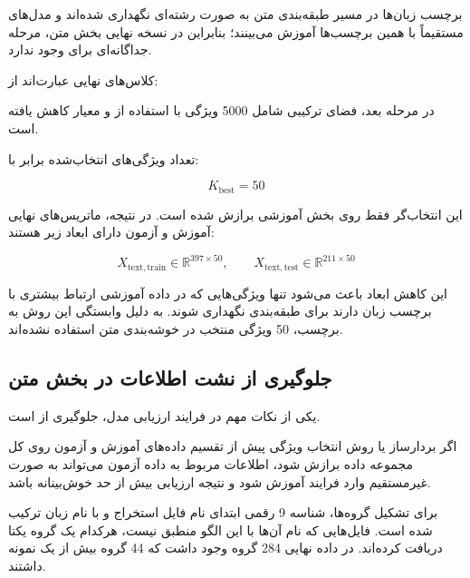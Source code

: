 برچسب زبان‌ها در مسیر طبقه‌بندی متن به صورت رشته‌ای نگهداری شده‌اند و مدل‌های
مستقیماً با همین برچسب‌ها آموزش می‌بینند؛ بنابراین در نسخه نهایی بخش متن، مرحله جداگانه‌ای برای
وجود ندارد.

کلاس‌های نهایی عبارت‌اند از:

\begin{center}
\end{center}

در مرحله بعد، فضای ترکیبی شامل 5000 ویژگی با استفاده از
و معیار
کاهش یافته است.

تعداد ویژگی‌های انتخاب‌شده برابر با:

\begin{equation}
K_{\mathrm{best}}=50
\end{equation}

این انتخاب‌گر فقط روی بخش آموزشی برازش شده است. در نتیجه، ماتریس‌های نهایی آموزش و آزمون دارای ابعاد زیر هستند:

\begin{equation}
X_{\mathrm{text,train}}
\in
\mathbb{R}^{397\times50},
\qquad
X_{\mathrm{text,test}}
\in
\mathbb{R}^{211\times50}
\end{equation}

این کاهش ابعاد باعث می‌شود تنها ویژگی‌هایی که در داده آموزشی ارتباط بیشتری با برچسب زبان دارند برای طبقه‌بندی نگهداری شوند. به دلیل وابستگی این روش به برچسب، 50 ویژگی منتخب در خوشه‌بندی متن استفاده نشده‌اند.


\subsection{جلوگیری از نشت اطلاعات در بخش متن}

یکی از نکات مهم در فرایند ارزیابی مدل، جلوگیری از
است.

اگر بردارساز
یا روش انتخاب ویژگی پیش از تقسیم داده‌های آموزش و آزمون روی کل مجموعه داده برازش شود، اطلاعات مربوط به داده آزمون می‌تواند به صورت غیرمستقیم وارد فرایند آموزش شود و نتیجه ارزیابی بیش از حد خوش‌بینانه باشد.

برای تشکیل گروه‌ها، شناسه 9 رقمی ابتدای نام فایل استخراج و با نام زبان ترکیب شده است. فایل‌هایی که نام آن‌ها با این الگو منطبق نیست، هرکدام یک گروه یکتا دریافت کرده‌اند. در داده نهایی 284 گروه وجود داشت که 44 گروه بیش از یک نمونه داشتند.

